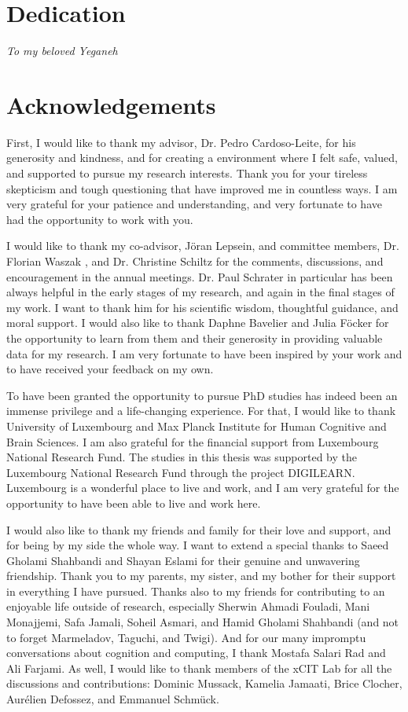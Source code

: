 \section*{Dedication}

\textit{To my beloved Yeganeh}

\newpage

\section*{Acknowledgements}

First, I would like to thank my advisor, Dr. Pedro Cardoso-Leite, for his generosity and kindness, and for creating a environment where I felt safe, valued, and supported to pursue my research interests. Thank you for your tireless skepticism and tough questioning that have improved me in countless ways. I am very grateful for your patience and understanding, and very fortunate to have had the opportunity to work with you.

I would like to thank my co-advisor, Jöran Lepsein, and committee members, Dr. Florian Waszak , and Dr. Christine Schiltz for the comments, discussions, and encouragement in the annual meetings. Dr. Paul Schrater in particular has been always helpful in the early stages of my research, and again in the final stages of my work. I want to thank him for his scientific wisdom, thoughtful guidance, and moral support. I would also like to thank Daphne Bavelier and Julia Föcker for the opportunity to learn from them and their generosity in providing valuable data for my research. I am very fortunate to have been inspired by your work and to have received your feedback on my own.

To have been granted the opportunity to pursue PhD studies has indeed been an immense privilege and a life-changing experience. For that, I would like to thank University of Luxembourg and Max Planck Institute for Human Cognitive and Brain Sciences. I am also grateful for the financial support from Luxembourg National Research Fund. The studies in this thesis was supported by the Luxembourg National Research Fund through the project DIGILEARN. Luxembourg is a wonderful place to live and work, and I am very grateful for the opportunity to have been able to live and work here.

I would also like to thank my friends and family for their love and support, and for being by my side the whole way. I want to extend a special thanks to Saeed Gholami Shahbandi and Shayan Eslami for their genuine and unwavering friendship. Thank you to my parents, my sister, and my bother for their support in everything I have pursued. Thanks also to my friends for contributing to an enjoyable life outside of research, especially Sherwin Ahmadi Fouladi, Mani Monajjemi, Safa Jamali, Soheil Asmari, and Hamid Gholami Shahbandi (and not to forget Marmeladov, Taguchi, and Twigi). And for our many impromptu conversations about cognition and computing, I thank Mostafa Salari Rad and Ali Farjami. As well, I would like to thank members of the xCIT Lab for all the discussions and contributions: Dominic Mussack, Kamelia Jamaati, Brice Clocher, Aurélien Defossez, and Emmanuel Schmück. 

